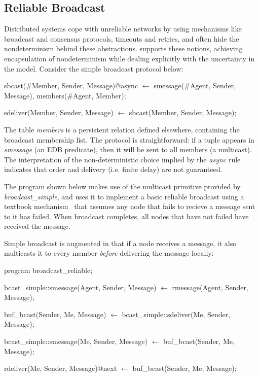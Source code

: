 \subsection{Reliable Broadcast}
Distributed systems cope with unreliable networks by using mechanisms like broadcast and consensus protocols, 
timeouts and retries, and often hide the nondeterminism behind these abstractions.  \lang supports these notions,
achieving encapsulation of nondeterminism while dealing explicitly with the uncertainty in the model.  Consider the simple
broadcast protocol below:

\begin{Dedalus}
sbcast(#Member, Sender, Message)@async \(\leftarrow\)
    smessage(#Agent, Sender, Message),
    members(#Agent, Member);

sdeliver(Member, Sender, Message) \(\leftarrow\)
    sbcast(Member, Sender, Message);

\end{Dedalus}

The table \emph{members} is a persistent relation defined elsewhere, containing the broadcast 
membership list.  
The protocol is straightforward: if a tuple appears in \emph{smessage} (an EDB predicate), then
it will be sent to all members (a multicast).  The interpretation of the non-deterministic choice implied by the
\emph{async} rule indicates that order and delivery (i.e. finite delay) are not guaranteed.

The program shown below makes use of the
multicast primitive provided by \emph{broadcast\_simple}, and uses it
to implement a basic reliable broadcast using a textbook
mechanism~\cite{mullender} that assumes any node that fails to recieve
a message sent to it has failed.  When broadcast completes, all nodes
that have not failed have received the message.

Simple broadcast is augmented in that if a node receives a message, it 
also multicasts it to every member \emph{before} delivering the message locally:

\begin{Dedalus}
program broadcast_reliable;

bcast_simple::smessage(Agent, Sender, Message)  \(\leftarrow\)
    rmessage(Agent, Sender, Message);

buf_bcast(Sender, Me, Message)  \(\leftarrow\)
    bcast_simple::sdeliver(Me, Sender, Message);

bcast_simple::smessage(Me, Sender, Message)  \(\leftarrow\)
    buf_bcast(Sender, Me, Message);

rdeliver(Me, Sender, Message)@next  \(\leftarrow\)
    buf_bcast(Sender, Me, Message);

\end{Dedalus}

